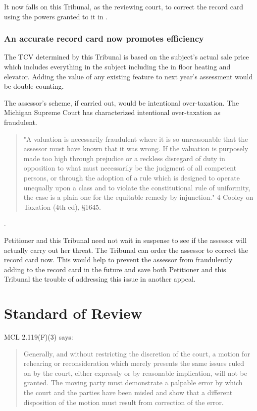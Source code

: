\documentclass[12pt,\documentclassflag]{michiganCourtOfAppealsBrief}
\begin{document}
It now falls on this Tribunal, as the reviewing court, to correct the record card using the powers granted to it in \cite{MCL 205.732(c)}.

\subsubsection{An accurate record card now promotes efficiency}

The TCV determined by this Tribunal is based on the subject's actual sale price which includes everything in the subject including the in floor heating and elevator. Adding the value of any existing feature to next year's assessment would be double counting.

The assessor's scheme, if carried out, would be intentional over-taxation. The Michigan Supreme Court has characterized intentional over-taxation as fraudulent.

\begin{quotation}
  "A valuation is necessarily fraudulent where it is so unreasonable that the assessor must have known that it was wrong. If the valuation is purposely made too high through prejudice or a reckless disregard of duty in opposition to what must necessarily be the judgment of all competent persons, or through the adoption of a rule which is designed to operate unequally upon a class and to violate the constitutional rule of uniformity, the case is a plain one for the equitable remedy by injunction." 4 Cooley on Taxation (4th ed), %
  \S 1645.
\end{quotation}
. 

Petitioner and this Tribunal need not wait in suspense to see if the assessor will actually carry out her threat. The Tribunal can order the assessor to correct the record card now. This would help to prevent the assessor from fraudulently adding to the record card in the future and save both Petitioner and this Tribunal the trouble of addressing this issue in another appeal.


\section{Standard of Review}

MCL 2.119(F)(3) says:

\begin{quote}
  Generally, and without restricting the discretion of the court, a motion for rehearing or reconsideration which merely presents the same issues ruled on by the court, either expressly or by reasonable implication, will not be granted. The moving party must demonstrate a palpable error by which the court and the parties have been misled and show that a different disposition of the motion must result from correction of the error.
\end{quote}
\end{document}
